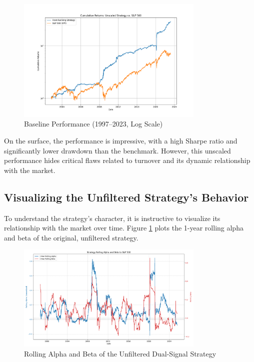 \documentclass{article}
\begin{document}
\begin{figure}[htbp]
\centering
\includegraphics[width=0.8\textwidth]{plots/performance.png}
\caption{Baseline Performance (1997--2023, Log Scale)}
\end{figure}

On the surface, the performance is impressive, with a high Sharpe ratio and significantly lower drawdown than the benchmark. However, this unscaled performance hides critical flaws related to turnover and its dynamic relationship with the market.

\subsection{Visualizing the Unfiltered Strategy's Behavior}
To understand the strategy's character, it is instructive to visualize its relationship with the market over time. Figure \ref{fig:rolling_metrics} plots the 1-year rolling alpha and beta of the original, unfiltered strategy.

\begin{figure}[htbp]
    \centering
    \includegraphics[width=0.8\textwidth]{plots/plot_rolling_metrics.png}
    \caption{Rolling Alpha and Beta of the Unfiltered Dual-Signal Strategy}
    \label{fig:rolling_metrics}
\end{figure}
\end{document}
